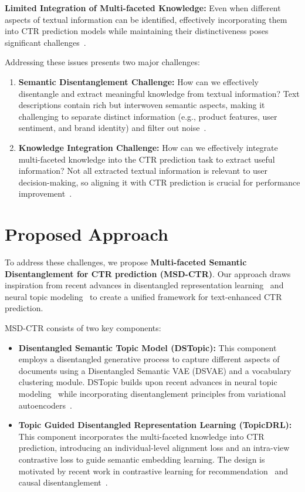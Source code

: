 \textbf{Limited Integration of Multi-faceted Knowledge:} Even when different aspects of textual information can be identified, effectively incorporating them into CTR prediction models while maintaining their distinctiveness poses significant challenges~\cite{zhang2024towards}.

Addressing these issues presents two major challenges: 
\begin{enumerate}
    \item \textbf{Semantic Disentanglement Challenge:} How can we effectively disentangle and extract meaningful knowledge from textual information? Text descriptions contain rich but interwoven semantic aspects, making it challenging to separate distinct information (e.g., product features, user sentiment, and brand identity) and filter out noise~\cite{wang2024disentangled, locatello2019challenging}.
    \item \textbf{Knowledge Integration Challenge:} How can we effectively integrate multi-faceted knowledge into the CTR prediction task to extract useful information? Not all extracted textual information is relevant to user decision-making, so aligning it with CTR prediction is crucial for performance improvement~\cite{ni2019justifying, wong2021improving}.
\end{enumerate}

\section{Proposed Approach}

To address these challenges, we propose \textbf{Multi-faceted Semantic Disentanglement for CTR prediction (MSD-CTR)}. Our approach draws inspiration from recent advances in disentangled representation learning~\cite{higgins2017beta, burgess2018understanding} and neural topic modeling~\cite{dieng2020topic, srivastava2017autoencoding} to create a unified framework for text-enhanced CTR prediction.

MSD-CTR consists of two key components: 

\begin{itemize}
    \item \textbf{Disentangled Semantic Topic Model (DSTopic):} This component employs a disentangled generative process to capture different aspects of documents using a Disentangled Semantic VAE (DSVAE) and a vocabulary clustering module. DSTopic builds upon recent advances in neural topic modeling~\cite{dieng2020topic, wu2023effective} while incorporating disentanglement principles from variational autoencoders~\cite{kingma2013auto, higgins2017beta}.
    
    \item \textbf{Topic Guided Disentangled Representation Learning (TopicDRL):} This component incorporates the multi-faceted knowledge into CTR prediction, introducing an individual-level alignment loss and an intra-view contrastive loss to guide semantic embedding learning. The design is motivated by recent work in contrastive learning for recommendation~\cite{lin2022feature} and causal disentanglement~\cite{yang2021causalvae, zheng2021disentangling}.
\end{itemize}


